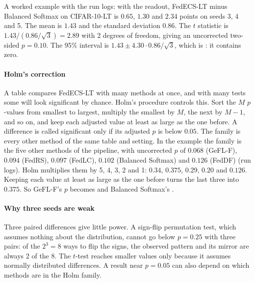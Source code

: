 A worked example with the run logs: with the readout, FedECS-LT minus Balanced Softmax on CIFAR-10-LT is $0.65$,
$1.30$ and $2.34$ points on seeds 3, 4 and 5. The mean is $1.43$ and the standard deviation $0.86$. The $t$ statistic
is $1.43/(0.86/\sqrt3)=2.89$ with 2 degrees of freedom, giving an uncorrected two-sided $p=0.10$. The 95\% interval is
$1.43\pm4.30\cdot0.86/\sqrt3$, which is : it contains zero.

\paragraph{Holm's correction} A table compares FedECS-LT with many methods at once, and with many tests some will look
significant by chance. Holm's procedure controls this. Sort the $M$ $p$-values from smallest to largest, multiply the
smallest by $M$, the next by $M-1$, and so on, and keep each adjusted value at least as large as the one before. A
difference is called significant only if its adjusted $p$ is below $0.05$. The family is every other method of the
same table and setting. In the example the family is the five other methods of the pipeline, with uncorrected $p$
of $0.068$ (GeFL-F), $0.094$ (FedRS), $0.097$ (FedLC), $0.102$ (Balanced Softmax) and $0.126$ (FedDF) (run logs). Holm
multiplies them by 5, 4, 3, 2 and 1: $0.34$, $0.375$, $0.29$, $0.20$ and $0.126$. Keeping each value at least as large
as the one before turns the last three into $0.375$. So GeFL-F's $p$ becomes  and Balanced
Softmax's .

\paragraph{Why three seeds are weak} Three paired differences give little power. A sign-flip permutation test, which
assumes nothing about the distribution, cannot go below $p=0.25$ with three pairs: of the $2^3=8$ ways to flip the
signs, the observed pattern and its mirror are always 2 of the 8. The $t$-test reaches smaller values only because it
assumes normally distributed differences. A result near $p=0.05$ can also depend on which methods are in the Holm
family.

